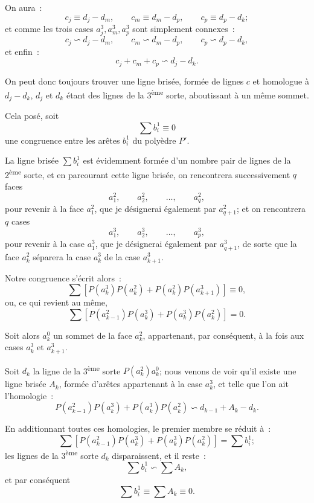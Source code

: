 \documentclass{article}
\begin{document}
On aura~:
\[ c_{j} \equiv d_{j} - d_{m}, \qquad c_{m} \equiv d_{m} - d_{p}, \qquad c_{p} \equiv d_{p} - d_{k}; \]
et comme les trois cases $a^{3}_{j}, a^{3}_{m}, a^{3}_{p}$ sont simplement connexes~:
\[ c_{j} \backsim d_{j} - d_{m}, \qquad c_{m} \backsim d_{m} - d_{p}, \qquad c_{p} \backsim d_{p} - d_{k}, \]
et enfin~:
\[ c_{j} + c_{m} + c_{p} \backsim d_{j} - d_{k}. \]

On peut donc toujours trouver une ligne brisée, formée de lignes $c$ et homologue à $d_{j} - d_{k}$, $d_{j}$ et $d_{k}$ étant des lignes de la 3\textsuperscript{ème} sorte, aboutissant à un même sommet.

Cela posé, soit
\[ \sum b^{1}_{i} \equiv 0 \tag{1} \]
une congruence entre les arêtes $b^{1}_{i}$ du polyèdre $P'$.

La ligne brisée $\displaystyle\sum b^{1}_{i}$ est évidemment formée d'un nombre pair de lignes de la 2\textsuperscript{ème} sorte, et en parcourant cette ligne brisée, on rencontrera successivement $q$ faces
\[ a^{2}_{1}, \qquad a^{2}_{2}, \qquad \ldots, \qquad a^{2}_{q}, \]
pour revenir à la face $a^{2}_{1}$, que je désignerai également par $a^{2}_{q+1}$; et on rencontrera $q$ cases
\[ a^{3}_{1}, \qquad a^{3}_{2}, \qquad \ldots, \qquad a^{3}_{p}, \] 
pour revenir à la case $a^{3}_{1}$, que je désignerai également par $a^{3}_{q+1}$, de sorte que la face $a^{2}_{k}$ séparera la case $a^{3}_{k}$ de la case $a^{3}_{k+1}$.

Notre congruence s'écrit alors~:
\[ \sum [P(a^{3}_{k}) P(a^{2}_{k}) + P(a^{2}_{k}) P(a^{3}_{k+1})] \equiv 0, \]
ou, ce qui revient au même,
\[ \sum [P(a^{2}_{k-1}) P(a^{3}_{k}) + P(a^{3}_{k}) P(a^{2}_{k})] = 0. \]

Soit alors $a^{0}_{k}$ un sommet de la face $a^{2}_{k}$, appartenant, par conséquent, à la fois aux cases $a^{3}_{k}$ et $a^{3}_{k+1}$.

Soit $d_{k}$ la ligne de la 3\textsuperscript{ème} sorte $P(a^{2}_{k}) a^{0}_{k}$; nous venons de voir qu'il existe une ligne brisée $A_{k}$, formée d'arêtes appartenant à la case $a^{3}_{k}$, et telle que l'on ait l'homologie~:
\[ P(a^{2}_{k-1}) P(a^{3}_{k}) + P(a^{3}_{k}) P(a^{2}_{k}) \backsim d_{k-1} + A_{k} - d_{k}. \]

En additionnant toutes ces homologies, le premier membre se réduit à~:
\[ \sum [P(a^{2}_{k-1}) P(a^{3}_{k}) + P(a^{3}_{k}) P(a^{2}_{k})] = \sum b^{1}_{i}; \]
les lignes de la 3\textsuperscript{ème} sorte $d_{k}$ disparaissent, et il reste~:
\[ \sum b^{1}_{i} \backsim \sum A_{k}, \]
et par conséquent
\[ \sum b^{1}_{i} \equiv \sum A_{k} \equiv 0. \]
\end{document}
